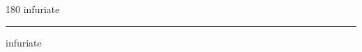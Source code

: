 
\begin{frame}
\begin{center}
\begin{turn}{180}
{\fontsize{2.5cm}{1em}\selectfont infuriate}
\end{turn}
\vspace{1em}\par  
\hrule
\vspace{1em}\par  
{\fontsize{2.5cm}{1em}\selectfont infuriate}
\end{center}
\end{frame}
